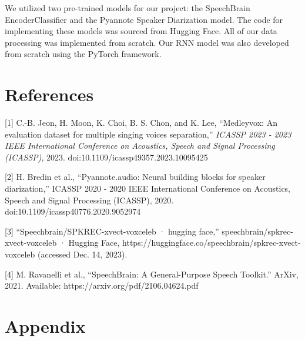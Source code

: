 \documentclass[conference]{IEEEtran}
\begin{document}
    We utilized two pre-trained models for our project: the SpeechBrain EncoderClassifier and the Pyannote Speaker Diarization model. The code for implementing these models was sourced from Hugging Face. All of our data processing was implemented from scratch. Our RNN model was also developed from scratch using the PyTorch framework.

\newpage

\section*{References}
[1] C.-B. Jeon, H. Moon, K. Choi, B. S. Chon, and K. Lee, “Medleyvox: An evaluation dataset for multiple singing voices separation,” \textit{ICASSP 2023 - 2023 IEEE International Conference on Acoustics, Speech and Signal Processing (ICASSP)}, 2023. doi:10.1109/icassp49357.2023.10095425 

\vspace{0.25in}

[2] H. Bredin et al., “Pyannote.audio: Neural building blocks for speaker diarization,” ICASSP 2020 - 2020 IEEE International Conference on Acoustics, Speech and Signal Processing (ICASSP), 2020. doi:10.1109/icassp40776.2020.9052974

\vspace{0.25in}

[3] “Speechbrain/SPKREC-xvect-voxceleb · hugging face,” speechbrain/spkrec-xvect-voxceleb · Hugging Face, https://huggingface.co/speechbrain/spkrec-xvect-voxceleb (accessed Dec. 14, 2023). 

\vspace{0.25in}

[4] M. Ravanelli et al., “SpeechBrain: A General-Purpose Speech Toolkit.” ArXiv, 2021. Available: https://arxiv.org/pdf/2106.04624.pdf
‌

\clearpage
\section{Appendix}
\end{document}
